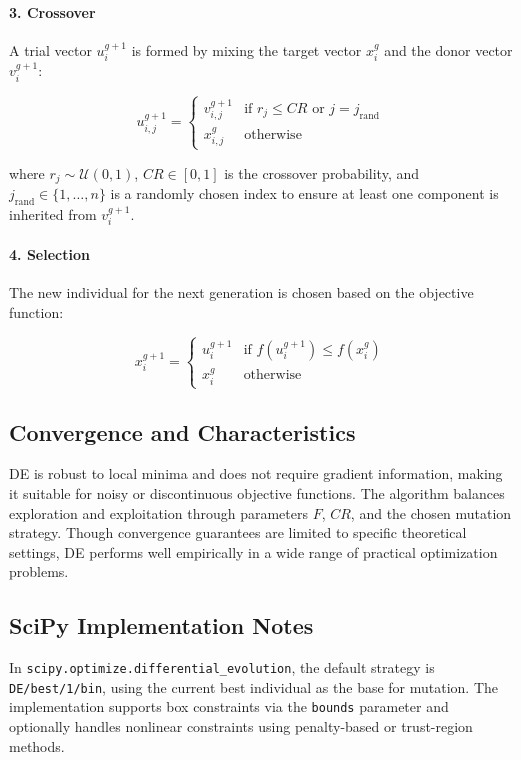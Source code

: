 \documentclass[a4paper]{article}
\theoremstyle{definition}
\theoremstyle{remark}
\begin{document}
\paragraph{3. Crossover}

A trial vector \( u_i^{g+1} \) is formed by mixing the target vector \( x_i^g \) and the donor vector \( v_i^{g+1} \):

\[
u_{i,j}^{g+1} =
\begin{cases}
v_{i,j}^{g+1} & \text{if } r_j \leq CR \text{ or } j = j_{\text{rand}} \\
x_{i,j}^g & \text{otherwise}
\end{cases}
\]

where \( r_j \sim \mathcal{U}(0, 1) \), \( CR \in [0, 1] \) is the crossover probability, and \( j_{\text{rand}} \in \{1, \ldots, n\} \) is a randomly chosen index to ensure at least one component is inherited from \( v_i^{g+1} \).

\paragraph{4. Selection}

The new individual for the next generation is chosen based on the objective function:

\[
x_i^{g+1} =
\begin{cases}
u_i^{g+1} & \text{if } f(u_i^{g+1}) \leq f(x_i^g) \\
x_i^g & \text{otherwise}
\end{cases}
\]

\subsection{Convergence and Characteristics}

DE is robust to local minima and does not require gradient information, making it suitable for noisy or discontinuous objective functions. The algorithm balances exploration and exploitation through parameters \( F \), \( CR \), and the chosen mutation strategy. Though convergence guarantees are limited to specific theoretical settings, DE performs well empirically in a wide range of practical optimization problems.

\subsection{SciPy Implementation Notes}

In \texttt{scipy.optimize.differential\_evolution}, the default strategy is \texttt{DE/best/1/bin}, using the current best individual as the base for mutation. The implementation supports box constraints via the \texttt{bounds} parameter and optionally handles nonlinear constraints using penalty-based or trust-region methods.
\end{document}
